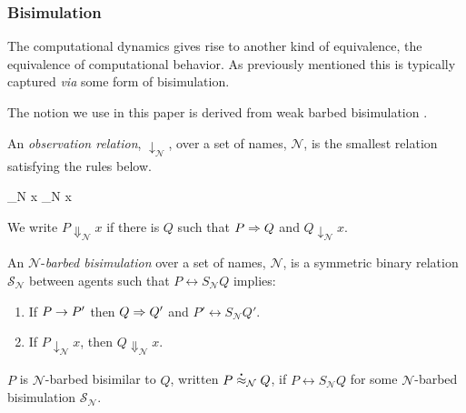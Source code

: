 

\subsubsection{Bisimulation}

The computational dynamics gives rise to another kind of equivalence,
the equivalence of computational behavior. As previously mentioned
this is typically captured \emph{via} some form of bisimulation.


The notion we use in this paper is derived from weak barbed
bisimulation \cite{milner91polyadicpi}. 

\begin{definition}
An \emph{observation relation}, $\downarrow_{\mathcal N}$, over a set
of names, $\mathcal N$, is the smallest relation satisfying the rules
below.

		  { \downarrow_{\mathcal N} x}
		  { \downarrow_{\mathcal N} x}

We write $P \Downarrow_{\mathcal N} x$ if there is $Q$ such that 
$P \Rightarrow Q$ and $Q \downarrow_{\mathcal N} x$.
\end{definition}

\begin{definition}
An  ${\mathcal N}$-\emph{barbed bisimulation} over a set of names, ${\mathcal N}$, is a symmetric binary relation 
${\mathcal S}_{\mathcal N}$ between agents such that $P\rel{S}_{\mathcal N}Q$ implies:
\begin{enumerate}
\item If $P \rightarrow P'$ then $Q \Rightarrow Q'$ and $P'\rel{S}_{\mathcal N} Q'$.
\item If $P\downarrow_{\mathcal N} x$, then $Q\Downarrow_{\mathcal N} x$.
\end{enumerate}
$P$ is ${\mathcal N}$-barbed bisimilar to $Q$, written
$P \stackrel{\centerdot}{\approx}_{\mathcal N} Q$, if $P \rel{S}_{\mathcal N} Q$ for some ${\mathcal N}$-barbed bisimulation ${\mathcal S}_{\mathcal N}$.
\end{definition}

